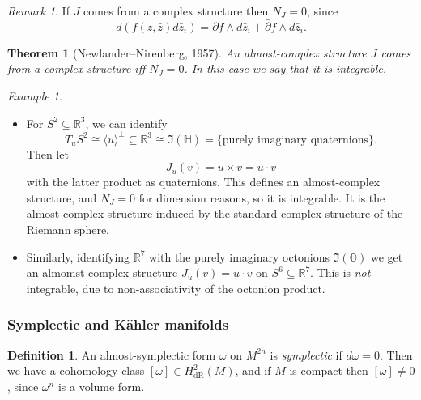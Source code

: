 \documentclass[a4paper]{article}
\newtheorem*{theorem}{Theorem}
\theoremstyle{definition}
\newtheorem*{definition}{Definition}
\theoremstyle{remark}
\newtheorem*{example}{Example}
\newtheorem*{remark}{Remark}
\newcommand{\dR}{\text{dR}}
\renewcommand{\H}{\mathbb{H}}
\renewcommand{\O}{\mathbb{O}}
\newcommand{\R}{\mathbb{R}}
\begin{document}
\begin{remark}
    If $J$ comes from a complex structure then $N_J=0$, since
    \begin{equation*}
        d(f(z,\bar z)d\bar z_i)
            = \partial f\wedge d\bar z_i + \bar\partial f\wedge d\bar z_i.
    \end{equation*}
\end{remark}

\begin{theorem}[Newlander--Nirenberg, 1957]
    An almost-complex structure $J$ comes from a complex structure iff $N_J=0$.
    In this case we say that it is \emph{integrable}.
\end{theorem}

\begin{example}
    ~
    \begin{itemize}
        \item For $S^2\subseteq\R^3$, we can identify
            \begin{equation*}
                T_uS^2 \cong \langle u\rangle^\perp\subseteq\R^3
                    \cong \Im(\H) = \{\text{purely imaginary quaternions}\}.
            \end{equation*}
            Then let
            \begin{equation*}
                J_u(v) = u\times v = u\cdot v
            \end{equation*}
            with the latter product as quaternions. This defines an
            almost-complex structure, and $N_J=0$ for dimension reasons, so it
            is integrable. It is the almost-complex structure induced by the
            standard complex structure of the Riemann sphere.

        \item Similarly, identifying $\R^7$ with the purely imaginary octonions
            $\Im(\O)$ we get an almomst complex-structure $J_u(v)=u\cdot v$ on
            $S^6\subseteq\R^7$. This is \emph{not} integrable, due to
            non-associativity of the octonion product.
    \end{itemize}
\end{example}

\subsubsection*{Symplectic and K\"ahler manifolds}

\begin{definition}
    An almost-symplectic form $\omega$ on $M^{2n}$ is \emph{symplectic} if
    $d\omega=0$. Then we have a cohomology class $[\omega]\in H^2_\dR(M)$, and
    if $M$ is compact then $[\omega]\ne0$, since $\omega^n$ is a volume form.
\end{definition}
\end{document}

